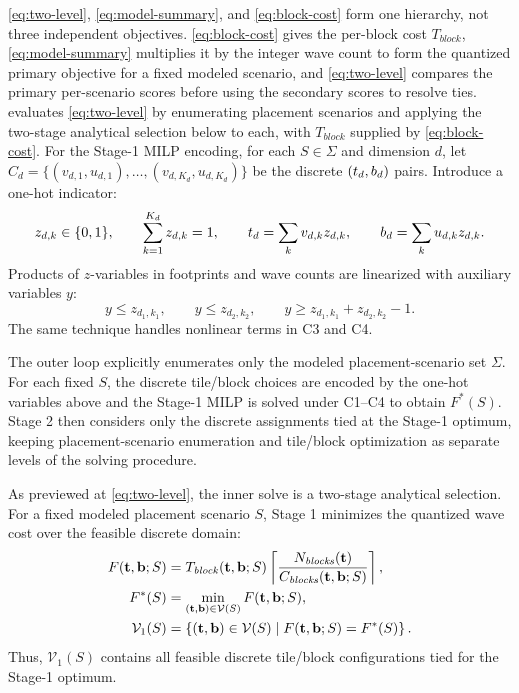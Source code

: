 \autoref{eq:two-level}, \autoref{eq:model-summary}, and \autoref{eq:block-cost} form one hierarchy, not three independent objectives. \autoref{eq:block-cost} gives the per-block cost \(T_{\mathit{block}}\), \autoref{eq:model-summary} multiplies it by the integer wave count to form the quantized primary objective for a fixed modeled scenario, and \autoref{eq:two-level} compares the primary per-scenario scores before using the secondary scores to resolve ties. \name evaluates \autoref{eq:two-level} by enumerating placement scenarios and applying the two-stage analytical selection below to each, with \(T_{\mathit{block}}\) supplied by \autoref{eq:block-cost}. For the Stage-1 MILP encoding, for each \(S\in\Sigma\) and dimension \(d\), let
\(C_d=\{(v_{d,1},u_{d,1}),\ldots,(v_{d,K_d},u_{d,K_d})\}\) be the discrete
\((t_d,b_d)\) pairs. Introduce a one-hot indicator:
\[
z_{d,k}\in\{0,1\},
\qquad \sum_{k=1}^{K_d}z_{d,k}=1,
\qquad t_d=\sum_k v_{d,k}z_{d,k},
\qquad b_d=\sum_k u_{d,k}z_{d,k}.
\]
Products of \(z\)-variables in footprints and wave counts are linearized with
auxiliary variables \(y\):
\[
y\le z_{d_1,k_1},
\qquad y\le z_{d_2,k_2},
\qquad y\ge z_{d_1,k_1}+z_{d_2,k_2}-1.
\]
The same technique handles nonlinear terms in C3 and C4.

The outer loop explicitly enumerates only the modeled placement-scenario set \(\Sigma\). For each fixed \(S\), the discrete tile/block choices are encoded by the one-hot variables above and the Stage-1 MILP is solved under C1--C4 to obtain \(F^*(S)\). Stage 2 then considers only the discrete assignments tied at the Stage-1 optimum, keeping placement-scenario enumeration and tile/block optimization as separate levels of the solving procedure.

As previewed at \autoref{eq:two-level}, the inner solve is a two-stage analytical selection. For a fixed modeled placement scenario \(S\), Stage 1 minimizes the quantized wave cost over the feasible discrete domain:
\begin{equation}
\begin{aligned}
F(\mathbf{t},\mathbf{b};S)
&=T_{\mathit{block}}(\mathbf{t},\mathbf{b};S)
  \left\lceil
  \frac{N_{\mathit{blocks}}(\mathbf{t})}
       {C_{\mathit{blocks}}(\mathbf{t},\mathbf{b};S)}
  \right\rceil,\\
F^*(S)
&=\min_{(\mathbf{t},\mathbf{b})\in\mathcal{V}(S)}
  F(\mathbf{t},\mathbf{b};S),\\
\mathcal{V}_1(S)
&=\left\{(\mathbf{t},\mathbf{b})\in\mathcal{V}(S)
  \mid F(\mathbf{t},\mathbf{b};S)=F^*(S)\right\}.
\end{aligned}
\label{eq:stage-one}
\end{equation}
Thus, \(\mathcal{V}_1(S)\) contains all feasible discrete tile/block configurations tied for the Stage-1 optimum.

